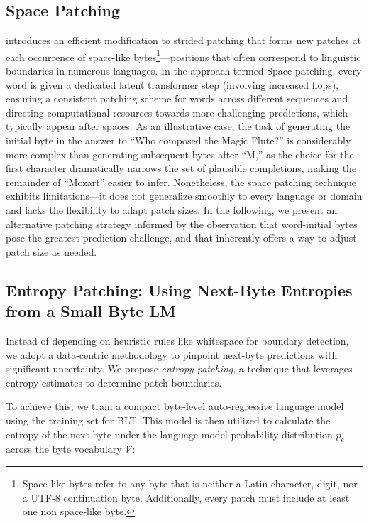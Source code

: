 \subsection{Space Patching}
\label{section:white-patch}

\citet{slagle2024spacebyte} introduces an efficient modification to strided patching that forms new patches at each occurrence of space-like bytes\footnote{
    Space-like bytes refer to any byte that is neither a Latin character, digit, nor a UTF-8 continuation byte. Additionally, every patch must include at least one non space-like byte. }—positions that often correspond to linguistic boundaries in numerous languages. In the approach termed Space patching, every word is given a dedicated latent transformer step (involving increased flops), ensuring a consistent patching scheme for words across different sequences and directing computational resources towards more challenging predictions, which typically appear after spaces. As an illustrative case, the task of generating the initial byte in the answer to “Who composed the Magic Flute?\uline{\hspace{.6em}}” is considerably more complex than generating subsequent bytes after “M,” as the choice for the first character dramatically narrows the set of plausible completions, making the remainder of “Mozart” easier to infer. Nonetheless, the space patching technique exhibits limitations—it does not generalize smoothly to every language or domain and lacks the flexibility to adapt patch sizes. In the following, we present an alternative patching strategy informed by the observation that word-initial bytes pose the greatest prediction challenge, and that inherently offers a way to adjust patch size as needed.

\subsection{Entropy Patching: Using Next-Byte Entropies from a Small Byte LM}
\label{section:dyn-patch}

Instead of depending on heuristic rules like whitespace for boundary detection, we adopt a data-centric methodology to pinpoint next-byte predictions with significant uncertainty. We propose \textit{entropy patching}, a technique that leverages entropy estimates to determine patch boundaries.

To achieve this, we train a compact byte-level auto-regressive language model using the training set for {\textsc BLT}. This model is then utilized to calculate the entropy of the next byte under the language model probability distribution $p_{e}$ across the byte vocabulary $\mathcal{V}$:

